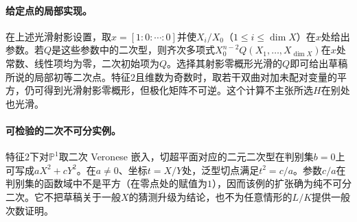\paragraph{给定点的局部实现。}
在上述光滑射影设置，取$x=[1:0:\cdots:0]$并使$X_i/X_0$（$1\le i\le \dim X$）在$x$处给出参数。若$Q$是这些参数中的二次型，则齐次多项式$X_0^{n-2}Q(X_1,\ldots,X_{\dim X})$在$x$处常数、线性项均为零，二次初始项为$Q$。选择其射影零概形光滑的$Q$即可给出草稿所说的局部初等二次点。特征$2$且维数为奇数时，取若干双曲对加未配对变量的平方，仍可得到光滑射影零概形，但极化矩阵不可逆。这个计算不主张所选$H$在别处也光滑。

\paragraph{可检验的二次不可分实例。}
特征$2$下对$\mathbb P^1$取二次 Veronese 嵌入，切超平面对应的二元二次型在判别集$b=0$上可写成$aX^2+cY^2$。在$a\ne0$、坐标$t=X/Y$处，泛型切点满足$t^2=c/a$。参数$c/a$在判别集的函数域中不是平方（在零点处的赋值为$1$），因而该例的扩张确为纯不可分二次。它不把草稿关于一般$X$的猜测升级为结论，也不为任意情形的$L/K$提供一般次数证明。
\endgroup
